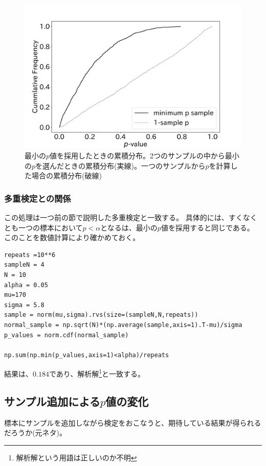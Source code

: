 \begin{figure}
  \begin{center}
    \includegraphics[width=15cm]{./image/04_/Minimum-p-values-choice-exmepriment.pdf}
    \caption{最小の$p$値を採用したときの累積分布。2つのサンプルの中から最小の$p$を選んだときの累積分布(実線)。一つのサンプルから$p$を計算した場合の累積分布(破線)}
        \label{fig:minimum_p_value_choice}
    \end{center}
\end{figure}

\subsubsection{多重検定との関係}
この処理は一つ前の節で説明した多重検定と一致する。
具体的には、すくなくとも一つの標本において$p<\alpha$となるは、最小の$p$値を採用すると同じである。
このことを数値計算により確かめておく。
\begin{lstlisting}
repeats =10**6
sampleN = 4
N = 10
alpha = 0.05
mu=170
sigma = 5.8
sample = norm(mu,sigma).rvs(size=(sampleN,N,repeats))
normal_sample = np.sqrt(N)*(np.average(sample,axis=1).T-mu)/sigma
p_values = norm.cdf(normal_sample)

np.sum(np.min(p_values,axis=1)<alpha)/repeats
\end{lstlisting}
結果は、$0.184$であり、解析解\footnote{解析解という用語は正しいのか不明}と一致する。



\subsection{サンプル追加による$p$値の変化}
標本にサンプルを追加しながら検定をおこなうと、期待している結果が得られるだろうか(元ネタ\cite{simmons2016false})。

